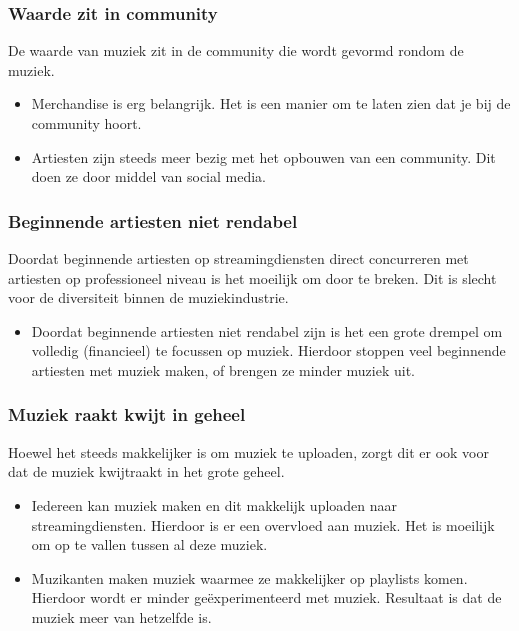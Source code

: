 \subsubsection*{Waarde zit in community}
\begin{quotebox}
De waarde van muziek zit in de community die wordt gevormd rondom de muziek.
\end{quotebox}
\begin{itemize}
  \item Merchandise is erg belangrijk. Het is een manier om te laten zien dat je bij de community hoort.
  \item Artiesten zijn steeds meer bezig met het opbouwen van een community. Dit doen ze door middel van social media.
\end{itemize}

\subsubsection*{Beginnende artiesten niet rendabel}
\begin{quotebox}
Doordat beginnende artiesten op streamingdiensten direct concurreren met artiesten op professioneel niveau is het moeilijk om door te breken. Dit is slecht voor de diversiteit binnen de muziekindustrie.
\end{quotebox}
\begin{itemize}
  \item Doordat beginnende artiesten niet rendabel zijn is het een grote drempel om volledig (financieel) te focussen op muziek. Hierdoor stoppen veel beginnende artiesten met muziek maken, of brengen ze minder muziek uit.
\end{itemize}

\subsubsection*{Muziek raakt kwijt in geheel}
\begin{quotebox}
Hoewel het steeds makkelijker is om muziek te uploaden, zorgt dit er ook voor dat de muziek kwijtraakt in het grote geheel.
\end{quotebox}
\begin{itemize}
  \item Iedereen kan muziek maken en dit makkelijk uploaden naar streamingdiensten. Hierdoor is er een overvloed aan muziek. Het is moeilijk om op te vallen tussen al deze muziek.
  \item Muzikanten maken muziek waarmee ze makkelijker op playlists komen. Hierdoor wordt er minder geëxperimenteerd met muziek. Resultaat is dat de muziek meer van hetzelfde is.
\end{itemize}

